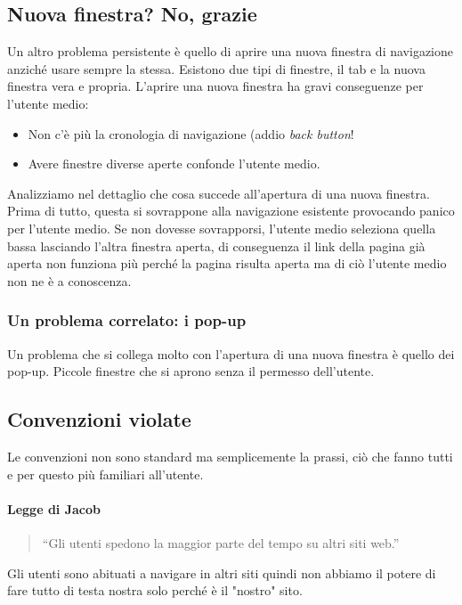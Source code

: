 		\subsection{Nuova finestra? No, grazie}
			Un altro problema persistente è quello di aprire una nuova finestra di navigazione anziché usare sempre la stessa.  Esistono due tipi di finestre, il tab e la nuova finestra vera e propria. L'aprire una nuova finestra ha gravi conseguenze per l'utente medio:
			\begin{itemize}
				\item Non c'è più la cronologia di navigazione (addio \emph{back button}!
				\item Avere finestre diverse aperte confonde l'utente medio.
			\end{itemize}
			Analizziamo nel dettaglio che cosa succede all'apertura di una nuova finestra. 
			Prima di tutto, questa si sovrappone alla navigazione esistente provocando panico per l'utente medio. Se non dovesse sovrapporsi, l'utente medio seleziona quella bassa lasciando l'altra finestra aperta, di conseguenza il link della pagina già aperta non funziona più perché la pagina risulta aperta ma di ciò l'utente medio non ne è a conoscenza.
			
			\subsubsection{Un problema correlato: i pop-up}
				Un problema che si collega molto con l'apertura di una nuova finestra è quello dei pop-up. Piccole finestre che si aprono senza il permesso dell'utente.
		
		\subsection{Convenzioni violate}
			Le convenzioni non sono standard ma semplicemente la prassi, ciò che fanno tutti e per questo più familiari all'utente. 
			
			\paragraph{Legge di Jacob}
			\begin{quote}
				``Gli utenti spedono la maggior parte del tempo su altri siti web.''
			\end{quote}
			Gli utenti sono abituati a navigare in altri siti quindi non abbiamo il potere di fare tutto di testa nostra solo perché è il "nostro" sito.
			
